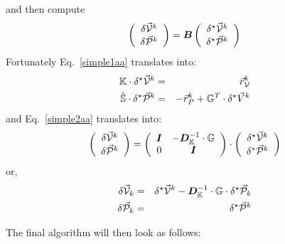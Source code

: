 and then compute
\begin{equation}
\left(
\begin{array}{c}
\delta \vec{\cal V}^k \\ 
\delta \vec{\cal P}^k
\end{array}
\right)
=
{\bm B}  
\left(
\begin{array}{c}
\delta^\star \vec{\cal V}^k \\ 
\delta^\star \vec{\cal P}^k
\end{array}
\right)
\label{simple2aa}
\end{equation}
Fortunately Eq.~\eqref{simple1aa} translates into:
\begin{eqnarray}
{\mathbb{K}} \cdot \delta^\star \vec{\cal V}^k &=&  \vec{r}_{\cal V}^k   \\
\hat{{\mathbb{S}}} \cdot  \delta^\star \vec{\cal P}^k &=&  - \vec{r}_P^k + {\mathbb{G}}^T \cdot \delta^\star \vec{V}^k 
\end{eqnarray}
and Eq.~\eqref{simple2aa} translates into:
\[
\left(
\begin{array}{c}
\delta \vec{\cal V}^k \\ 
\delta \vec{\cal P}^k
\end{array}
\right)
=
\left(
\begin{array}{cc}
{\bm I} & -{\bm D}_{\mathbb{K}}^{-1}\cdot {\mathbb{G}} \\
0 & {\bm I}
\end{array}
\right)
\cdot
\left(
\begin{array}{c}
\delta^\star \vec{\cal V}^k \\ 
\delta^* \vec{\cal P}^k
\end{array}
\right)
\]
or, 
\begin{eqnarray}
\delta \vec{\cal V}_k &=& \delta^\star \vec{\cal V}^k 
-{\bm D}_{\mathbb{K}}^{-1}\cdot {\mathbb{G}} \cdot\delta^\star \vec{\cal P}_k \\
\delta \vec{\cal P}_k &=& \delta^\star \vec{\cal P}^k
\end{eqnarray}

\newpage
The final algorithm will then look as follows:

